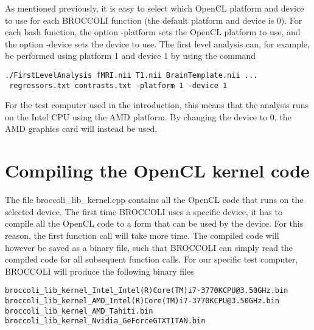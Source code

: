 As mentioned previously, it is easy to select which OpenCL platform and device to use for each BROCCOLI function (the default platform and device is 0). For each bash function, the option -platform sets the OpenCL platform to use, and the option -device sets the device to use. The first level analysis can, for example, be performed using platform 1 and device 1 by using the command

\begin{verbatim}
./FirstLevelAnalysis fMRI.nii T1.nii BrainTemplate.nii ...
 regressors.txt contrasts.txt -platform 1 -device 1
\end{verbatim}
	
For the test computer used in the introduction, this means that the analysis runs on the Intel CPU using the AMD platform. By changing the device to 0, the AMD graphics card will instead be used. 

\section{Compiling the OpenCL kernel code}

The file broccoli\_lib\_kernel.cpp contains all the OpenCL code that runs on the selected device. The first time BROCCOLI uses a specific device, it has to compile all the OpenCL code to a form that can be used by the device. For this reason, the first function call will take more time. The compiled code will however be saved as a binary file, such that BROCCOLI can simply read the compiled code for all subsequent function calls. For our specific test computer, BROCCOLI will produce the following binary files

\begin{verbatim}
broccoli_lib_kernel_Intel_Intel(R)Core(TM)i7-3770KCPU@3.50GHz.bin
broccoli_lib_kernel_AMD_Intel(R)Core(TM)i7-3770KCPU@3.50GHz.bin 
broccoli_lib_kernel_AMD_Tahiti.bin
broccoli_lib_kernel_Nvidia_GeForceGTXTITAN.bin
\end{verbatim}





